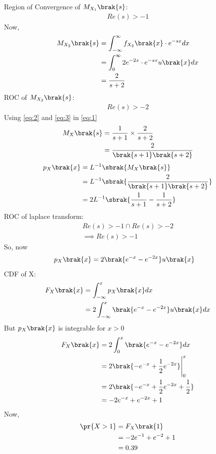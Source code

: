 \documentclass[journal,12pt,twocolumn]{IEEEtran}
\theoremstyle{remark}
\begin{document}
Region of Convergence of $M_{X_1}\brak{s}$:
\begin{align}
Re(s) > -1
\end{align}
Now,
\begin{align}
M_{X_2}\brak{s} &= \int_{-\infty}^{\infty} f_{X_2}\brak{x}\cdot e^{-sx}dx\\
&=\int_{0}^{\infty} 2e^{-2x}\cdot e^{-sx}u\brak{x}dx\\
&= \frac{2}{s+2}\label{eq:3}
\end{align}
ROC of $M_{X_2}\brak{s}$:
\begin{align}
Re(s) > -2
\end{align}
Using \eqref{eq:2} and \eqref{eq:3} in \eqref{eq:1}
\begin{align}
M_X\brak{s} &= \frac{1}{s+1} \times \frac{2}{s+2}\\
&= \frac{2}{\brak{s+1}\brak{s+2}}
\end{align}
\begin{align}
p_X\brak{x} &= L^{-1}\sbrak{M_X\brak{s}}\\
&= L^{-1}\sbrak{\frac{2}{\brak{s+1}\brak{s+2}}}\\
&= 2L^{-1}\sbrak{\frac{1}{s+1}-\frac{1}{s+2}}
\end{align}
ROC of laplace transform:
\begin{align}
Re(s)>-1 \cap Re(s)>-2\\
\implies Re(s)>-1 
\end{align}
So, now 
\begin{align}
p_X\brak{x} &= 2\brak{e^{-x}-e^{-2x}}u\brak{x}
\end{align}
CDF of X:
\begin{align}
F_{X}\brak{x} &= \int_{-\infty}^{x} p_X\brak{x}dx\\
&= 2\int_{-\infty}^{x}\brak{e^{-x}-e^{-2x}}u\brak{x}dx
\end{align}
But $p_X\brak{x}$ is integrable for $x>0$
\begin{align}
F_{X}\brak{x} &= 2\int_{0}^{x} \brak{e^{-x}-e^{-2x}}dx\\
&= 2\brak{-e^{-x}+\frac{1}{2}e^{-2x}}\Bigg|_{0}^{x}\\
&= 2\brak{-e^{-x}+\frac{1}{2}e^{-2x}+\frac{1}{2}}\\
&= -2e^{-x}+e^{-2x}+1
\end{align}
Now,
\begin{align}
\pr{X>1}&= F_{X}\brak{1}\\
&= -2e^{-1}+e^{-2}+1\\
&= 0.39
\end{align}
\end{document}
